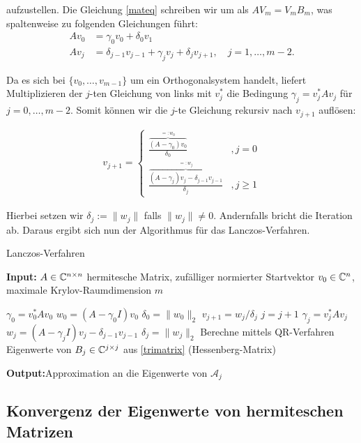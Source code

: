 \documentclass{article}
\theoremstyle{plain}
\begin{document}
aufzustellen. Die Gleichung \eqref{mateq} schreiben wir um als $AV_m = V_m B_m$, was spaltenweise zu folgenden Gleichungen führt:
\begin{align*}
	A v_0 &= \gamma_0 v_0 + \delta_0 v_1 \\
	A v_j &= \delta_{j-1} v_{j-1} + \gamma_j v_j + \delta_j v_{j+1}, \quad j=1, \dots, m-2.
\end{align*}

Da es sich bei $\{v_0, \dots, v_{m-1}\}$ um ein Orthogonalsystem handelt, liefert Multiplizieren der $j$-ten Gleichung von links mit $v_j^*$ die Bedingung $\gamma_j = v_j^*Av_j$ für $j = 0, \dots, m-2$. Somit können wir die $j$-te Gleichung rekursiv nach $v_{j+1}$ auflösen:

\begin{align*}
	v_{j+1} = \begin{cases}
		\frac{\overbrace{(A-\gamma_0)v_0}^{=:w_0}}{\delta_0} &,j = 0 \\
		\frac{\overbrace{(A-\gamma_j)v_j - \delta_{j-1} v_{j-1}}^{=:w_j}}{\delta_j} &,j \geq 1
	\end{cases}
\end{align*}

Hierbei setzen wir $\delta_j := \|w_j\|$ falls $\|w_j\| \neq 0$. Andernfalls bricht die Iteration ab. Daraus ergibt sich nun der Algorithmus für das Lanczos-Verfahren.

\renewcommand{\algorithmicrequire}{\textbf{Input:}}
\renewcommand{\algorithmicensure}{\textbf{Output:}}

\begin{algorithm}
	\label{Lanczos-Verfahren}
	\caption{Lanczos-Verfahren}
	\algorithmicrequire{ $A \in \mathbb{C}^{n\times n}$ hermitesche Matrix, zufälliger normierter Startvektor $v_0 \in \mathbb{C}^n$, maximale Krylov-Raumdimension $m$}
	\begin{algorithmic}[1]
		\State $\gamma_0 = v_0^*Av_0$
		\State $w_0 = (A-\gamma_0 I)v_0$
	  \State $\delta_0 = \|w_0\|_2$
		\State $v_{j+1} = w_j/\delta_j$
		\State $j = j+1$
		\State $\gamma_j = v_j^*Av_j$
		\State $w_j = (A-\gamma_j I)v_j - \delta_{j-1}v_{j-1}$
		\State $\delta_j = \|w_j\|_2$
		\EndWhile
		\State Berechne mittels QR-Verfahren Eigenwerte von $B_j \in \mathbb{C}^{j \times j}$ aus \eqref{trimatrix} (Hessenberg-Matrix)
	\end{algorithmic}
	\algorithmicensure{Approximation an die Eigenwerte von $\mathcal{A}_j$}
\end{algorithm}


\subsection{Konvergenz der Eigenwerte von hermiteschen Matrizen}\label{konvergenz}
\end{document}
